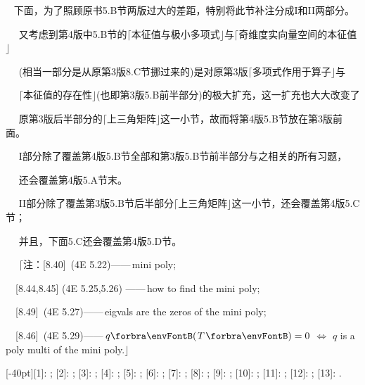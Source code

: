\documentclass[a4paper, 11pt, UTF8]{article}
\begin{document}
\begin{large}
{\Comment\,\,\, 下面，为了照顾原书{\tgbf 5.B}节两版过大的差距，特别将此节补注分成{\tgbf I}和{\tgbf II}两部分。\par\qquad\qquad\,\,\,\,\,\,
又考虑到第4版中{\tgbf 5.B}节的$\lceil$本征值与极小多项式$\rfloor$与$\lceil$奇维度实向量空间的本征值$\rfloor$\par\qquad\qquad\,\,\,\,\,\,
(相当一部分是从原第3版{\tgbf 8.C}节挪过来的)是对原第3版$\lceil$多项式作用于算子$\rfloor$与\par\qquad\qquad\,\,\,\,\,\,
$\lceil$本征值的存在性$\rfloor$(也即第3版{\tgbf 5.B}前半部分)的极大扩充，这一扩充也大大改变了\par\qquad\qquad\,\,\,\,\,\,
原第3版后半部分的$\lceil$上三角矩阵$\rfloor$这一小节，故而将第4版{\tgbf 5.B}节放在第3版前面。{\par}\qquad\qquad\,\,\,\,\,\,
{\tgbf I}部分除了覆盖第4版{\tgbf 5.B}节全部和第3版{\tgbf 5.B}节前半部分与之相关的所有习题，{\Large\par}\qquad\qquad\,\,\,\,\,\,
还会覆盖第4版{\tgbf 5.A}节末。\par\qquad\qquad\,\,\,\,\,\,
{\tgbf II}部分除了覆盖第3版5.B节后半部分$\lceil$上三角矩阵$\rfloor$这一小节，还会覆盖第4版{\tgbf 5.C}节；\par\qquad\qquad\,\,\,\,\,\,
并且，下面{\tgbf 5.C}还会覆盖第4版{\tgbf 5.D}节。\par\qquad\qquad\,\,\,\,\,\,
$\lceil$注：[8.40]\qquad\, \OR (4E 5.22)\qquad ——\,mini poly;\par\qquad\qquad\qquad\quad\,\,\,\,
[8.44,8.45] \OR (4E 5.25,5.26) ——\,how to find the mini poly;\par\qquad\qquad\qquad\quad\,\,\,\,
[8.49]\qquad\, \OR (4E 5.27)\qquad ——\,eigvals are the zeros of the mini poly;\par\qquad\qquad\qquad\quad\,\,\,\,
[8.46]\qquad\, \OR (4E 5.29)\qquad ——\,$q\Par{T} = 0$ $\Leftrightarrow$ $q$ is a poly multi of the mini poly.$\rfloor$
}\par\large


[-40pt]{[1]: ; [2]: ; [3]: ; [4]: ; [5]: ; [6]: ; [7]: ; [8]: ; [9]: ; [10]: ; [11]: ; [12]: ; [13]: .}


\end{large}
\end{document}
